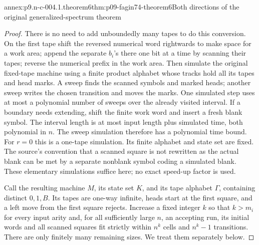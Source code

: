 \begin{annexitem}{annex:p9.n-c-004.1.theorem6}{thm:p09-fagin74-theorem6}{Both directions of the original generalized-spectrum theorem}
\begin{proof}
There is no need to add unboundedly many tapes to do this conversion.  On the
first tape shift the reversed numerical word rightwards to make space for a
work area; append the separate \(b_i\)'s there one bit at a time by scanning
their tapes; reverse the numerical prefix in the work area.  Then simulate
the original fixed-tape machine using a finite product alphabet whose tracks
hold all its tapes and head marks.  A sweep finds the scanned symbols and
marked heads; another sweep writes the chosen transition and moves the marks.
One simulated step uses at most a polynomial number of sweeps over the
already visited interval.  If a boundary needs extending, shift the finite
work word and insert a fresh blank symbol.  The interval length is at most
input length plus simulated time, both polynomial in \(n\).  The sweep
simulation therefore has a polynomial time bound.  For \(r=0\) this is a
one-tape simulation.  Its finite alphabet and state set are fixed.
The source's convention that a scanned square is not rewritten as the actual
blank can be met by a separate nonblank symbol coding a simulated blank.
These elementary simulations suffice here; no exact speed-up factor is used.

Call the resulting machine \(M\), its state set \(K\), and its tape
alphabet \(\Gamma\), containing distinct \(0,1,B\).
Its tapes are one-way infinite, heads start at the first square, and a
left move from the first square rejects.  Increase a fixed integer \(k\)
so that \(k>m_i\) for every input arity and, for all sufficiently large
\(n\), an accepting run, its initial words and all scanned squares fit
strictly within \(n^k\) cells and \(n^k-1\) transitions.  There are
only finitely many remaining sizes.  We treat them separately below.


\end{proof}
\end{annexitem}
